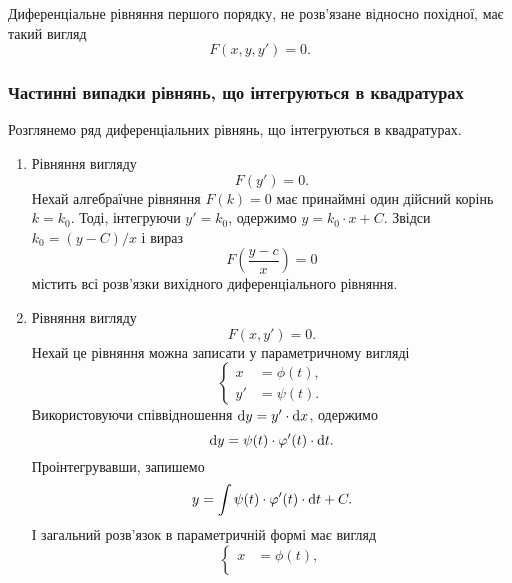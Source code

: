 Диференціальне рівняння першого порядку, не розв’язане відносно похідної, має такий вигляд
\begin{equation}
	\label{eq:1.5.1}
	F(x, y, y') = 0. 	
\end{equation}

\subsubsection{Частинні випадки рівнянь, що інтегруються в квадратурах}

Розглянемо ряд диференціальних рівнянь, що інтегруються в квадратурах.
\begin{enumerate}
	\item Рівняння вигляду 
	\begin{equation}
		\label{eq:1.5.2}
		F(y') = 0.
	\end{equation}
	Нехай алгебраїчне рівняння $F(k) = 0$ має принаймні один дійсний корінь $k = k_0$. Тоді, інтегруючи $y' = k_0$, одержимо $y = k_0 \cdot x + C$. Звідси $k_0 = (y - C) / x$ і вираз
	\begin{equation}
		\label{eq:1.5.3}
		F \left( \frac{y - c}{x} \right) = 0	
	\end{equation}
	містить всі розв’язки вихідного диференціального рівняння.
	\item Рівняння вигляду 
	\begin{equation}
		\label{eq:1.5.4}
		F(x, y') = 0.
	\end{equation}
	Нехай це рівняння можна записати у параметричному вигляді
	\begin{equation}
		\label{eq:1.5.5}
		\left\{\begin{aligned}
			x &= \phi(t), \\
			y' &= \psi(t).
		\end{aligned}\right.
	\end{equation}
	Використовуючи співвідношення $\mathop{}\!\mathrm{d} y = y ' \cdot \mathop{}\!\mathrm{d} x$, одержимо 
	\begin{equation}
		\label{eq:1.5.6}
		\mathop{}\!\mathrm{d} y = \psi(t) \cdot \varphi'(t) \cdot \mathop{}\!\mathrm{d} t.
	\end{equation}
	Проінтегрувавши, запишемо
	\begin{equation}
		\label{eq:1.5.7}
		y = \int \psi(t) \cdot \varphi'(t) \cdot \mathop{}\!\mathrm{d} t + C.
	\end{equation}
	І загальний розв’язок в параметричній формі має вигляд
	\begin{equation}
		\label{eq:1.5.8}
		\left\{\begin{aligned}
		x &= \phi(t), \\

\end{aligned}
\end{equation}
\end{enumerate}
